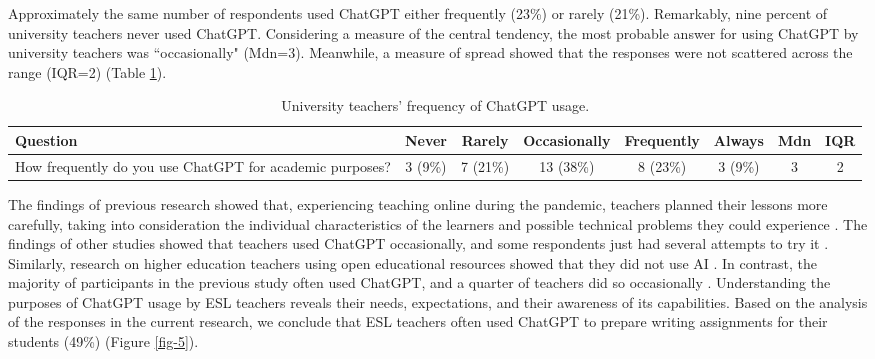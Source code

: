 \documentclass[english]{textolivre}
\begin{document}
Approximately the same number of respondents used ChatGPT either frequently (23\%) or rarely (21\%). Remarkably, nine percent of university teachers never used ChatGPT. Considering a measure of the central tendency, the most probable answer for using ChatGPT by university teachers was ``occasionally" (Mdn=3). Meanwhile, a measure of spread showed that the responses were not scattered across the range (IQR=2) (Table \ref{tab-1}).

\begin{table}[h!]
\centering
\caption{University teachers’ frequency of ChatGPT usage.}\label{tab-1}
\begin{tabularx}{\textwidth}{@{}Xccccccc@{}}
\toprule
Question & Never & Rarely & Occasionally & Frequently & Always & Mdn & IQR \\
\midrule
How frequently do you use ChatGPT for academic purposes? & 3 (9\%) & 7 (21\%) & 13 (38\%) & 8 (23\%) & 3 (9\%) & 3 & 2 \\
\bottomrule
\end{tabularx}
\end{table}

The findings of previous research showed that, experiencing teaching online during the pandemic, teachers planned their lessons more carefully, taking into consideration the individual characteristics of the learners and possible technical problems they could experience \cites[p. 9]{kohnke2023}[p. 20]{westerlund2023}. The findings of other studies showed that teachers used ChatGPT occasionally, and some respondents just had several attempts to try it \cites[p. 107]{iqbal2023}[p. 136]{synekop2024}. Similarly, research on higher education teachers using open educational resources showed that they did not use AI \cite[p. 14]{schroder2023}. In contrast, the majority of participants in the previous study often used ChatGPT, and a quarter of teachers did so occasionally \cite[p. 15]{nguyen2023}. Understanding the purposes of ChatGPT usage by ESL teachers reveals their needs, expectations, and their awareness of its capabilities. Based on the analysis of the responses in the current research, we conclude that ESL teachers often used ChatGPT to prepare writing assignments for their students (49\%) (Figure \ref{fig-5}).
\end{document}
